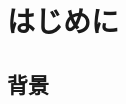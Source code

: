 \documentclass[a4paper,11pt,uplatex]{ujreport}
\begin{document}
\setcounter{page}{0}

\tableofcontents

\clearpage


\chapter{はじめに}
\label{chap:Introduction}


\section{背景}
\label{sec:背景}
\end{document}
